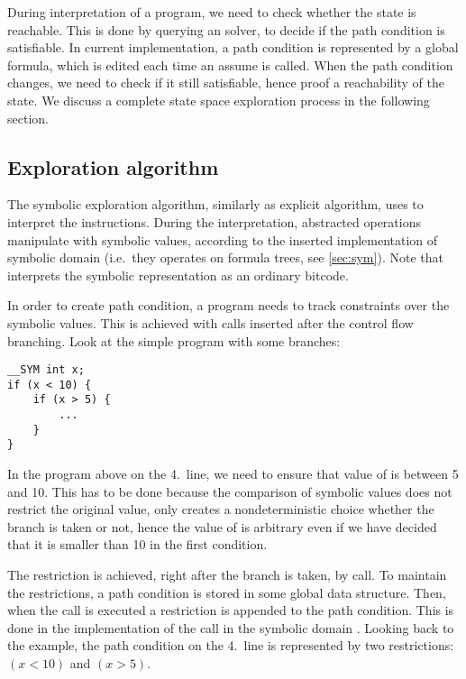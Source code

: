 During interpretation of a program, we need to check whether the state is
reachable. This is done by querying an \SMT solver, to decide if the path
condition is satisfiable. In current implementation, a path condition is
represented by a global formula, which is edited each time an assume is called.
When the path condition changes, we need to check if it still satisfiable, hence
proof a reachability of the state. We discuss a complete state space
exploration process in the following section.

\subsection{Exploration algorithm}
The symbolic exploration algorithm, similarly as explicit algorithm, uses \DIVM
to interpret the \LLVM instructions. During the interpretation, abstracted
operations manipulate with symbolic values, according to the inserted implementation of
symbolic domain (i.e.~they operates on formula trees, see \autoref{sec:sym}).
Note that \DIVM interprets the symbolic representation as an ordinary \LLVM bitcode.

In order to create path condition, a program needs to track constraints over the
symbolic values. This is achieved with  calls inserted after the
control flow branching. Look at the simple program with some branches:
\begin{verbatim}
__SYM int x;
if (x < 10) {
    if (x > 5) {
        ...
    }
}
\end{verbatim}
In the program above on the 4.~line, we need to ensure that value of  is
between 5 and 10. This has to be done because the comparison of symbolic values
does not restrict the original value, only creates a nondeterministic choice
whether the branch is taken or not, hence the value of  is arbitrary even if
we have decided that it is smaller than 10 in the first condition.

The restriction is achieved, right after the branch is taken, by
 call. To maintain the restrictions, a path condition is stored in
some global data structure. Then, when the  call is executed a
restriction is appended to the path condition. This is done in the
implementation of the call  in the symbolic domain
. Looking back to
the example, the path condition on the 4.~line is represented by two
restrictions: $(x < 10)$ and $(x > 5)$.


